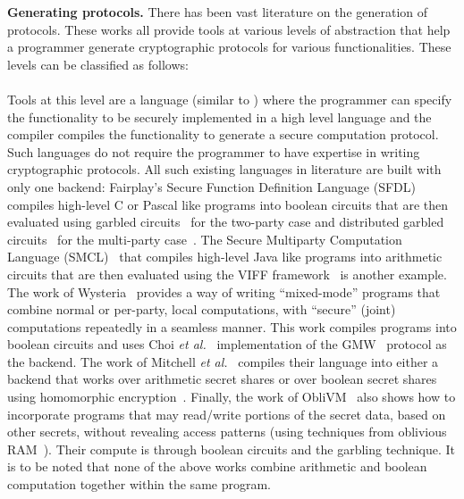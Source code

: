 \noindent\textbf{Generating \mpc protocols.}
There has been vast literature on the generation of \mpc protocols. These works all provide tools at various levels of abstraction that help a programmer generate cryptographic protocols for various functionalities. These levels can be classified as follows: 
\\\\
 Tools at this level are a language (similar to \tool) where the programmer can specify the functionality to be securely implemented in a high level language and the compiler compiles the functionality to generate a secure computation protocol. Such languages do not require the programmer to have expertise in writing cryptographic protocols. All such existing languages in literature are built with only one backend: Fairplay's Secure Function Definition Language (SFDL)~\cite{fairplay,fairplaymp} compiles high-level C or Pascal like programs into boolean circuits that are then evaluated using garbled circuits~\cite{yao} for the two-party case and distributed garbled circuits~\cite{bmr} for the multi-party case~\cite{bmr}. The Secure Multiparty Computation Language (SMCL)~\cite{smcl} that compiles high-level Java like programs into arithmetic circuits that are then evaluated using the VIFF framework~\cite{viff} is another example. The work of Wysteria~\cite{wysteria} provides a way of writing ``mixed-mode'' programs that combine normal or per-party, local computations, with ``secure'' (joint) computations repeatedly in a seamless manner. This work compiles programs into boolean circuits and uses Choi {\em et al.}~\cite{choi} implementation of the GMW~\cite{gmw} protocol as the backend. The work of Mitchell {\em et al.}~\cite{lambdaps} compiles their language into either a backend that works over arithmetic secret shares or over boolean secret shares using homomorphic encryption~\cite{gentry}. Finally, the work of ObliVM~\cite{oblivm} also shows how to incorporate programs that may read/write portions of the secret data, based on other secrets, without revealing access patterns (using techniques from oblivious RAM~\cite{oram1,oram2}). Their compute is through boolean circuits and the garbling technique. It is to be noted that none of the above works combine arithmetic and boolean computation together within the same program. 
\\\\

